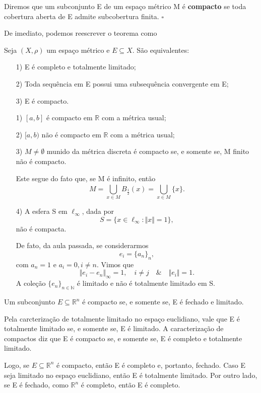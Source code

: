 \documentclass[metric_notes.tex]{subfiles}
\begin{document}
\begin{def*}
	Diremos que um subconjunto E de um espaço métrico M é \textbf{compacto} se toda cobertura aberta de E admite subcobertura finita. \(\square\)
\end{def*}
De imediato, podemos reescrever o teorema como
\begin{crl*}
	Seja \((X, \rho )\) um espaço métrico e \(E\subseteq X\). São equivalentes:
	\begin{itemize}
		\item[1)] E é completo e totalmente limitado;
		\item[2)] Toda sequência em E possui uma subsequência convergente em E;
		\item[3)] E é compacto.
	\end{itemize}
\end{crl*}
\begin{example}
	\begin{itemize}
		\item[1)] \([a, b]\) é compacto em \(\mathbb{R}\) com a métrica usual;
		\item[2)] \([a, b)\) não é compacto em \(\mathbb{R}\) com a métrica usual;
		\item[3)] \(M \neq\emptyset\) munido da métrica discreta é compacto se, e somente se,
		      M finito não é compacto.

		      Este segue do fato que, se M é infinito, então
		      \[
			      M = \bigcup_{x\in M}^{}B_{\frac{1}{2}}(x) = \bigcup_{x\in M}^{}\{x\}.
		      \]
		\item[4)] A esfera S em \(\ell_{\infty}\), dada por
		      \[
			      S = \{x\in \ell_{\infty}: \Vert x \Vert = 1\},
		      \]
		      não é compacta.

		      De fato, da aula passada, se considerarmos
		      \[
			      e_{i} = \{a_{n}\}_{n},
		      \]
		      com \(a_{n} = 1\) e \(a_{i} = 0, i\neq n.\) Vimos que
		      \[
			      \Vert e_{i}-e_{n} \Vert_{\infty} = 1,\quad i\neq j\quad\&\quad \Vert e_{i} \Vert = 1.
		      \]
		      A coleção \(\{e_{n}\}_{n\in \mathbb{N}}\) é limitado e não é totalmente limitado em S.
	\end{itemize}
\end{example}
\begin{theorem*}
	Um subconjunto \(E\subseteq \mathbb{R}^{n}\) é compacto se, e somente se, E é fechado e limitado.
\end{theorem*}
\begin{proof*}
	Pela carcterização de totalmente limitado no espaço euclidiano, vale que E é totalmente limitado se, e somente se, E é limitado.
	A caracterização de compactos diz que E é compacto se, e somente se, E é completo e totalmente limitado.

	Logo, se \(E\subseteq \mathbb{R}^{n}\) é compacto, então E é completo e, portanto, fechado. Caso E seja limitado no espaço euclidiano,
	então E é totalmente limitado. Por outro lado, se E é fechado, como \(\mathbb{R}^{n}\) é completo, então E é completo. \qedsymbol
\end{proof*}
\end{document}
